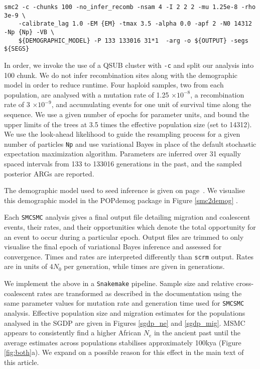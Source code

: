 \begin{verbatim}
smc2 -c -chunks 100 -no_infer_recomb -nsam 4 -I 2 2 2 -mu 1.25e-8 -rho 3e-9 \
    -calibrate_lag 1.0 -EM {EM} -tmax 3.5 -alpha 0.0 -apf 2 -N0 14312 -Np {Np} -VB \
    ${DEMOGRAPHIC_MODEL} -P 133 133016 31*1  -arg -o ${OUTPUT} -segs ${SEGS}
\end{verbatim}

In order, we invoke the use of a QSUB cluster with {\tt -c} and split our analysis into 100 chunk. We do not infer recombination sites along with the demographic model in order to reduce runtime. Four haploid samples, two from each population, are analysed with a mutation rate of 1.25 $\times 10^{-8}$, a recombination rate of 3 $\times 10^{-9}$, and accumulating events for one unit of survival time along the sequence. We use a given number of epochs for parameter units, and bound the upper limits of the trees at 3.5 times the effective population size (set to 14312). We use the look-ahead likelihood to guide the resampling process for a given number of particles {\tt Np} and use variational Bayes in place of the default stochastic expectation maximization algorithm. Parameters are inferred over 31 equally spaced intervals from 133 to 133016 generations in the past, and the sampled posterior ARGs are reported. 

The demographic model used to seed inference is given on page~\pageref{app:dem_model:seed}. We visualise this demographic model in the POPdemog package in Figure \ref{smc2demog} \cite{Zhou2018}.

Each {\tt SMCSMC} analysis gives a final output file detailing migration and coalescent events, their rates, and their opportunities which denote the total opportunity for an event to occur during a particular epoch. Output files are trimmed to only visualise the final epoch of variational Bayes inference and assessed for convergence. Times and rates are interpreted differently than {\tt scrm} output. Rates are in units of $4N_0$ per generation, while times are given in generations. 

We implement the above in a {\tt Snakemake} pipeline. Sample size and relative cross-coalescent rates are transformed as described in the documentation using the same parameter values for mutation rate and generation time used for {\tt SMCSMC} analysis. Effective population size and migration estimates for the populations analysed in the SGDP are given in Figures \ref{sgdp_ne} and \ref{sgdp_mig}. MSMC appears to consistently find a higher African $N_e$ in the ancient past until the average estimates across populations stabilises approximately 100kya (Figure \ref{fig:both}a). We expand on a possible reason for this effect in the main text of this article.


